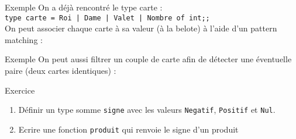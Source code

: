 \documentclass[10pt]{beamer}
\begin{document}
\begin{frame}{\Ctitle}{\stitle}
	\begin{exampleblock}{Exemple}
		On a déjà rencontré le type carte : \\
		\texttt{type carte = Roi | Dame | Valet | Nombre of int;;}\\
		On peut associer chaque carte à sa valeur (à la belote) à l'aide d'un pattern matching :
	\end{exampleblock}
\end{frame}

\begin{frame}{\Ctitle}{\stitle}
	\begin{exampleblock}{Exemple}
		On peut aussi filtrer un couple de carte afin de détecter une éventuelle paire (deux cartes identiques) :
	\end{exampleblock}
\end{frame}


\begin{frame}{\Ctitle}{\stitle}
	\begin{exampleblock}{Exercice}
		\begin{enumerate}
			\item<1-> Définir un type somme {\tt signe} avec les valeurs {\tt Negatif}, {\tt Positif} et {\tt Nul}.
			\onslide<2-> 
			\item<3-> Ecrire une fonction {\tt produit} qui renvoie le signe d'un produit 
		\onslide<4-> 
		\end{enumerate}
	\end{exampleblock}
\end{frame}
\end{document}
